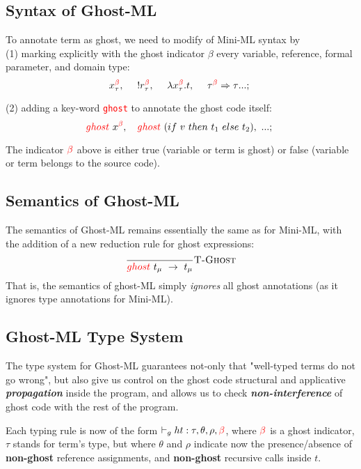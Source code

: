 \documentclass[a4paper,11pt,oneside]{article}
\theoremstyle{plain}
\newcommand{\rouge}[1]{\textcolor{red}{#1}}
\newcommand{\gb}{\beta}
\newcommand{\gbr}{\textcolor{red}{\gb}}
\begin{document}
\subsection{Syntax of Ghost-ML}
To annotate term as ghost,  we need to modify of Mini-ML syntax by\\

(1) marking explicitly with the ghost indicator $\beta$ every variable, reference,  formal parameter, and domain type: 
$$x_\tau^{\rouge{\beta}},~ \quad !r^{\rouge{\beta}}_{\tau},~ \quad \lambda x_\tau^{\rouge{\beta}}. t,~ \quad {\tau^{\rouge{\beta}} \Rightarrow \tau}...;~$$

(2) adding a key-word \texttt{\rouge{ghost}} to annotate the ghost code itself: 
$$\rouge{ghost}~x^{\rouge{\beta}},~~~\rouge{ghost}~(if~v~ then~ t_1~ else~ t_2),~ ...;~$$

The indicator $\gbr$ above is either true (variable or term is ghost) or false (variable or term belongs to the source code).

\subsection{Semantics of Ghost-ML}

The semantics of Ghost-ML remains essentially the same as for Mini-ML,
with the addition of a new reduction rule for ghost expressions:
$$\dfrac{}{\rouge{ghost}~ t_\mu~ \rightarrow~ t_\mu}{\textsc{T-Ghost}}$$
That is, the semantics of ghost-ML simply \textit{ignores} all ghost annotations (as it ignores type annotations for Mini-ML).

\subsection{Ghost-ML Type System}

The type system for Ghost-ML guarantees not-only that "well-typed terms do not go wrong", but also give us control on the ghost code structural and applicative \textbf{\textit{propagation}} inside the program, and allows us to check  \textbf{\textit{non-interference}} of ghost code with the rest of the program.   

	Each typing rule is now of the form $\vdash_gh t : \tau,
        \theta, \rho, \rouge{\beta}$, where $\rouge{\beta}$ is a ghost indicator, $\tau$ stands for term's type, but where $\theta$ and $\rho$ indicate now the presence/absence of \textbf{non-ghost} reference assignments, and \textbf{non-ghost} recursive calls inside $t$.
\end{document}
